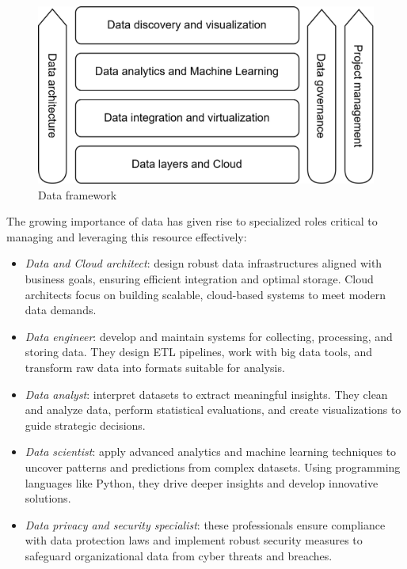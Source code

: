 \begin{figure}[H]
    \centering
    \includegraphics[width=0.5\linewidth]{images/bis10.png}
    \caption{Data framework}
\end{figure}

The growing importance of data has given rise to specialized roles critical to managing and leveraging this resource effectively:
\begin{itemize}
    \item \textit{Data and Cloud architect}: design robust data infrastructures aligned with business goals, ensuring efficient integration and optimal storage. 
        Cloud architects focus on building scalable, cloud-based systems to meet modern data demands.
    \item \textit{Data engineer}: develop and maintain systems for collecting, processing, and storing data.
        They design ETL pipelines, work with big data tools, and transform raw data into formats suitable for analysis.
    \item \textit{Data analyst}:  interpret datasets to extract meaningful insights. 
        They clean and analyze data, perform statistical evaluations, and create visualizations to guide strategic decisions.
    \item \textit{Data scientist}:  apply advanced analytics and machine learning techniques to uncover patterns and predictions from complex datasets. 
        Using programming languages like Python, they drive deeper insights and develop innovative solutions.
    \item \textit{Data privacy and security specialist}: these professionals ensure compliance with data protection laws and implement robust security measures to safeguard organizational data from cyber threats and breaches.
\end{itemize}